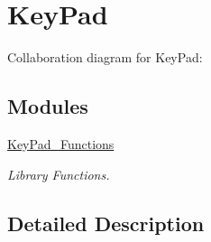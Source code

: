 \hypertarget{group___key_pad}{}\section{Key\+Pad}
\label{group___key_pad}
Collaboration diagram for Key\+Pad\+:
\subsection*{Modules}
\begin{DoxyCompactItemize}
\item 
\hyperlink{group___key_pad___functions}{Key\+Pad\+\_\+\+Functions}
\begin{DoxyCompactList}\small\item\em Library Functions. \end{DoxyCompactList}\end{DoxyCompactItemize}


\subsection{Detailed Description}
